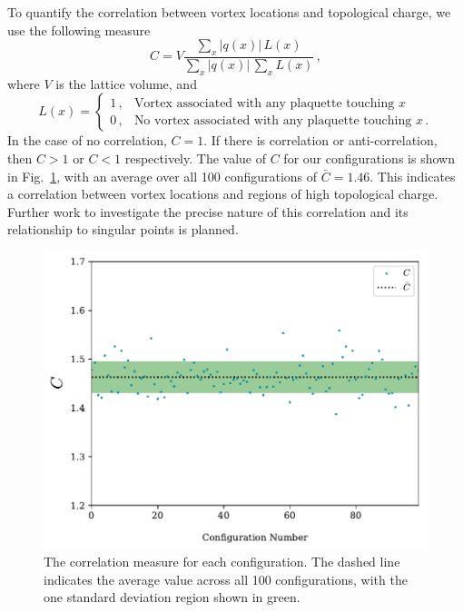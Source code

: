 To quantify the correlation between vortex locations and topological charge, we use the following measure
%
\begin{equation}
C = V\frac{\sum_x |q(x)|\,L(x)}{\sum_x |q(x)|\,\sum_x L(x)}\, ,
\end{equation}
%
where $V$ is the lattice volume, and
%
\begin{equation}
L(x) = 
\begin{cases}
1\, , & \text{Vortex associated with any plaquette touching $x$}\\
0\, , & \text{No vortex associated with any plaquette touching $x$}\, .
\end{cases}
\end{equation}
%
In the case of no correlation, $C=1$. If there is correlation or anti-correlation, then $C>1$ or $C<1$ respectively. The value of $C$ for our configurations is shown in Fig.~\ref{fig:Correlation}, with an average over all 100 configurations of $\bar{C} = 1.46$. This indicates a correlation between vortex locations and regions of high topological charge. Further work to investigate the precise nature of this correlation and its relationship to singular points is planned.\\
%
\begin{figure}[H]
\centering
\includegraphics[width=0.8\linewidth]{./Correlation.pdf}
\caption[The correlation measure for each configuration.]{\label{fig:Correlation} The correlation measure for each configuration. The dashed line indicates the average value across all 100 configurations, with the one standard deviation region shown in green.}
\end{figure}
%

